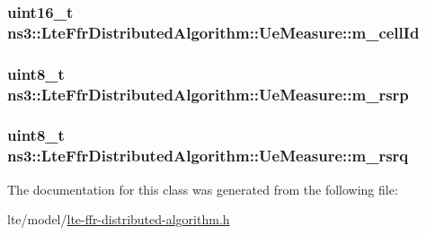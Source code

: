 \subsubsection[{\texorpdfstring{m\+\_\+cell\+Id}{m_cellId}}]{\setlength{\rightskip}{0pt plus 5cm}uint16\+\_\+t ns3\+::\+Lte\+Ffr\+Distributed\+Algorithm\+::\+Ue\+Measure\+::m\+\_\+cell\+Id}\hypertarget{classns3_1_1LteFfrDistributedAlgorithm_1_1UeMeasure_a4b256fc342fce5a9b29b72c573c697d2}{}\label{classns3_1_1LteFfrDistributedAlgorithm_1_1UeMeasure_a4b256fc342fce5a9b29b72c573c697d2}
\subsubsection[{\texorpdfstring{m\+\_\+rsrp}{m_rsrp}}]{\setlength{\rightskip}{0pt plus 5cm}uint8\+\_\+t ns3\+::\+Lte\+Ffr\+Distributed\+Algorithm\+::\+Ue\+Measure\+::m\+\_\+rsrp}\hypertarget{classns3_1_1LteFfrDistributedAlgorithm_1_1UeMeasure_abd43e3ab589c381aa4c87f39d878c471}{}\label{classns3_1_1LteFfrDistributedAlgorithm_1_1UeMeasure_abd43e3ab589c381aa4c87f39d878c471}
\subsubsection[{\texorpdfstring{m\+\_\+rsrq}{m_rsrq}}]{\setlength{\rightskip}{0pt plus 5cm}uint8\+\_\+t ns3\+::\+Lte\+Ffr\+Distributed\+Algorithm\+::\+Ue\+Measure\+::m\+\_\+rsrq}\hypertarget{classns3_1_1LteFfrDistributedAlgorithm_1_1UeMeasure_ae3a132fe4e0a1e7ce225d0c7d453c858}{}\label{classns3_1_1LteFfrDistributedAlgorithm_1_1UeMeasure_ae3a132fe4e0a1e7ce225d0c7d453c858}


The documentation for this class was generated from the following file\+:\begin{DoxyCompactItemize}
\item 
lte/model/\hyperlink{lte-ffr-distributed-algorithm_8h}{lte-\/ffr-\/distributed-\/algorithm.\+h}\end{DoxyCompactItemize}
